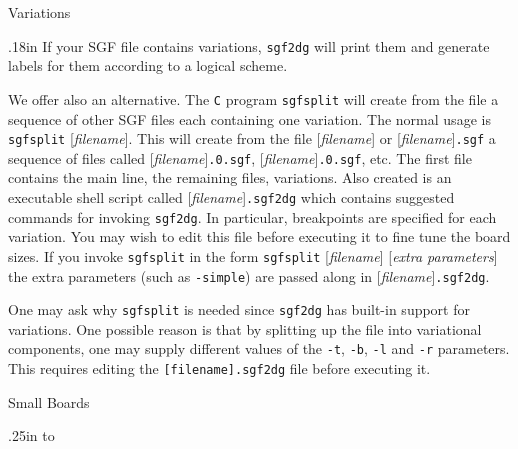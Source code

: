 \vfil\eject
\centerline{\titlefont Variations}
\vglue.18in
If your SGF file contains variations, {\tt sgf2dg} will print them
and generate labels for them according to a logical scheme.

We offer also an alternative. The {\tt C} program {\tt sgfsplit} will 
create from the file a sequence of other SGF files each containing
one variation. The normal usage is {\tt sgfsplit} [{\it filename}]. This will
create from the file [{\it filename}] or [{\it filename}]{\tt .sgf} a sequence of
files called [{\it filename}]{\tt .0.sgf}, [{\it filename}]{\tt .0.sgf}, etc. The first
file contains the main line, the remaining files, variations. Also
created is an executable shell script called [{\it filename}]{\tt .sgf2dg}
which contains suggested commands for invoking {\tt sgf2dg}. In particular,
breakpoints are specified for each variation. You may wish to edit this file
before executing it to fine tune the board sizes. If you invoke {\tt sgfsplit}
in the form {\tt sgfsplit} [{\it filename}] [{\it extra parameters}] the
extra parameters (such as {\tt -simple}) are passed along in 
[{\it filename}]{\tt .sgf2dg}.

One may ask why {\tt sgfsplit} is needed since {\tt sgf2dg} has built-in
support for variations. One possible reason is that by splitting up the
file into variational components, one may supply different values of
the {\tt -t}, {\tt -b}, {\tt -l} and {\tt -r} parameters. This requires
editing the {\tt [filename].sgf2dg} file before executing it.

\centerline{\titlefont Small Boards}
\vglue.25in
\hbox to\vskip 40pt

